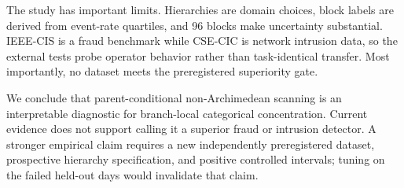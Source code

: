 \documentclass[journal]{IEEEtran}
\begin{document}
The study has important limits. Hierarchies are domain choices, block labels are derived from event-rate quartiles, and 96 blocks make uncertainty substantial. IEEE-CIS is a fraud benchmark while CSE-CIC is network intrusion data, so the external tests probe operator behavior rather than task-identical transfer. Most importantly, no dataset meets the preregistered superiority gate.

We conclude that parent-conditional non-Archimedean scanning is an interpretable diagnostic for branch-local categorical concentration. Current evidence does not support calling it a superior fraud or intrusion detector. A stronger empirical claim requires a new independently preregistered dataset, prospective hierarchy specification, and positive controlled intervals; tuning on the failed held-out days would invalidate that claim.



\end{document}
